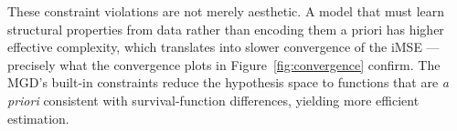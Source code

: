 \documentclass{article}
\begin{document}
These constraint violations are not merely aesthetic.  A model that must learn structural properties from data rather than encoding them a priori has higher effective complexity, which translates into slower convergence of the iMSE --- precisely what the convergence plots in Figure~\ref{fig:convergence} confirm.  The MGD's built-in constraints reduce the hypothesis space to functions that are \emph{a priori} consistent with survival-function differences, yielding more efficient estimation.
\end{document}

